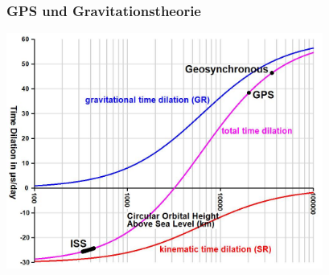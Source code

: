 %
%
%
\bgroup
\begin{frame}[t]
\setlength{\abovedisplayskip}{5pt}
\setlength{\belowdisplayskip}{5pt}
\frametitle{GPS und Gravitationstheorie}
\begin{center}
\includegraphics[width=10.4cm]{../slides/8/gps.jpg}
\end{center}
\end{frame}
\egroup
